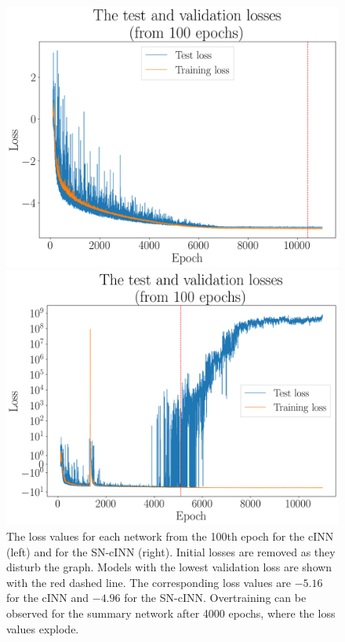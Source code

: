 \begin{figure}[h!]
	\begin{minipage}{.5\textwidth}
		\centering
		\includegraphics[width=\linewidth]{figures/inference/losses}
	\end{minipage}%
	\begin{minipage}{.5\textwidth}
		\centering
		\includegraphics[width=\linewidth]{figures/inference/losses_SN}
	\end{minipage}
	\centering
	\caption{The loss values for each network from the 100th epoch for the cINN (left) and for the SN-cINN (right). Initial losses are removed as they disturb the graph. Models with the lowest validation loss are shown with the red dashed line. The corresponding loss values are $-5.16$ for the cINN and $-4.96$ for the SN-cINN. Overtraining can be observed for the summary network after 4000 epochs, where the loss values explode.}
	\label{fig:losses}
\end{figure}

